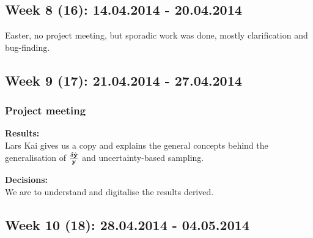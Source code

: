 






\subsection*{Week 8 (16): 14.04.2014 - 20.04.2014}
Easter, no project meeting, but sporadic work was done, mostly clarification and bug-finding.


\subsection*{Week 9 (17): 21.04.2014 - 27.04.2014}\subsubsection*{Project meeting}


\textbf{Results:}\\
Lars Kai gives us a copy and explains the general concepts behind the generalisation of $\frac{\delta \hat{{\bf y}}}{{\bf y}}$ and uncertainty-based sampling.

\textbf{Decisions:}\\
We are to understand and digitalise the results derived.




\subsection*{Week 10 (18): 28.04.2014 - 04.05.2014}
